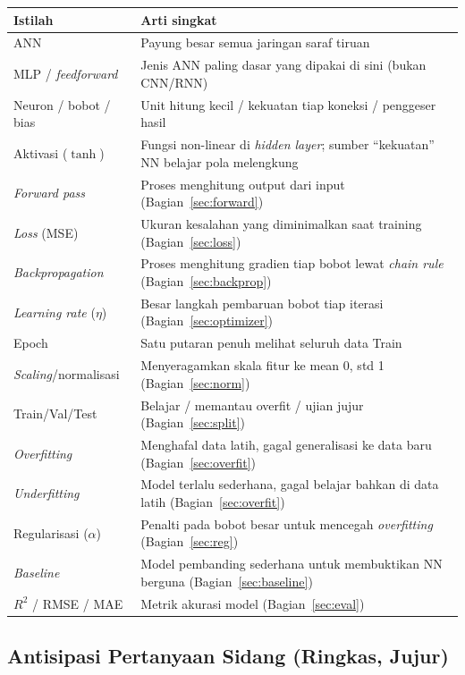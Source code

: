 \documentclass[11pt,a4paper]{article}
\begin{document}
\begin{center}
\begin{longtable}{@{}p{3.6cm} p{9.8cm}@{}}
\toprule
\textbf{Istilah} & \textbf{Arti singkat} \\
\midrule
\endhead
ANN & Payung besar semua jaringan saraf tiruan \\
MLP / \emph{feedforward} & Jenis ANN paling dasar yang dipakai di sini (bukan CNN/RNN) \\
Neuron / bobot / bias & Unit hitung kecil / kekuatan tiap koneksi / penggeser hasil \\
Aktivasi ($\tanh$) & Fungsi non-linear di \emph{hidden layer}; sumber ``kekuatan'' NN belajar pola melengkung \\
\emph{Forward pass} & Proses menghitung output dari input (Bagian~\ref{sec:forward}) \\
\emph{Loss} (MSE) & Ukuran kesalahan yang diminimalkan saat training (Bagian~\ref{sec:loss}) \\
\emph{Backpropagation} & Proses menghitung gradien tiap bobot lewat \emph{chain rule} (Bagian~\ref{sec:backprop}) \\
\emph{Learning rate} ($\eta$) & Besar langkah pembaruan bobot tiap iterasi (Bagian~\ref{sec:optimizer}) \\
Epoch & Satu putaran penuh melihat seluruh data Train \\
\emph{Scaling}/normalisasi & Menyeragamkan skala fitur ke mean 0, std 1 (Bagian~\ref{sec:norm}) \\
Train/Val/Test & Belajar / memantau overfit / ujian jujur (Bagian~\ref{sec:split}) \\
\emph{Overfitting} & Menghafal data latih, gagal generalisasi ke data baru (Bagian~\ref{sec:overfit}) \\
\emph{Underfitting} & Model terlalu sederhana, gagal belajar bahkan di data latih (Bagian~\ref{sec:overfit}) \\
Regularisasi ($\alpha$) & Penalti pada bobot besar untuk mencegah \emph{overfitting} (Bagian~\ref{sec:reg}) \\
\emph{Baseline} & Model pembanding sederhana untuk membuktikan NN berguna (Bagian~\ref{sec:baseline}) \\
$R^2$ / RMSE / MAE & Metrik akurasi model (Bagian~\ref{sec:eval}) \\
\bottomrule
\end{longtable}
\end{center}

\subsection{Antisipasi Pertanyaan Sidang (Ringkas, Jujur)}
\end{document}
